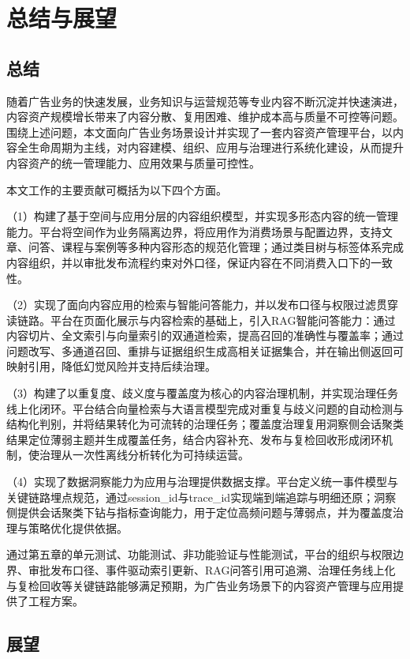 
\chapter{总结与展望}
\section{总结}

随着广告业务的快速发展，业务知识与运营规范等专业内容不断沉淀并快速演进，内容资产规模增长带来了内容分散、复用困难、维护成本高与质量不可控等问题。围绕上述问题，本文面向广告业务场景设计并实现了一套内容资产管理平台，以内容全生命周期为主线，对内容建模、组织、应用与治理进行系统化建设，从而提升内容资产的统一管理能力、应用效果与质量可控性。

本文工作的主要贡献可概括为以下四个方面。

（1）构建了基于空间与应用分层的内容组织模型，并实现多形态内容的统一管理能力。平台将空间作为业务隔离边界，将应用作为消费场景与配置边界，支持文章、问答、课程与案例等多种内容形态的规范化管理；通过类目树与标签体系完成内容组织，并以审批发布流程约束对外口径，保证内容在不同消费入口下的一致性。

（2）实现了面向内容应用的检索与智能问答能力，并以发布口径与权限过滤贯穿读链路。平台在页面化展示与内容检索的基础上，引入RAG智能问答能力：通过内容切片、全文索引与向量索引的双通道检索，提高召回的准确性与覆盖率；通过问题改写、多通道召回、重排与证据组织生成高相关证据集合，并在输出侧返回可映射引用，降低幻觉风险并支持后续治理。

（3）构建了以重复度、歧义度与覆盖度为核心的内容治理机制，并实现治理任务线上化闭环。平台结合向量检索与大语言模型完成对重复与歧义问题的自动检测与结构化判别，并将结果转化为可流转的治理任务；覆盖度治理复用洞察侧会话聚类结果定位薄弱主题并生成覆盖任务，结合内容补充、发布与复检回收形成闭环机制，使治理从一次性离线分析转化为可持续运营。

（4）实现了数据洞察能力为应用与治理提供数据支撑。平台定义统一事件模型与关键链路埋点规范，通过session\_id与trace\_id实现端到端追踪与明细还原；洞察侧提供会话聚类下钻与指标查询能力，用于定位高频问题与薄弱点，并为覆盖度治理与策略优化提供依据。

通过第五章的单元测试、功能测试、非功能验证与性能测试，平台的组织与权限边界、审批发布口径、事件驱动索引更新、RAG问答引用可追溯、治理任务线上化与复检回收等关键链路能够满足预期，为广告业务场景下的内容资产管理与应用提供了工程方案。

\section{展望}

